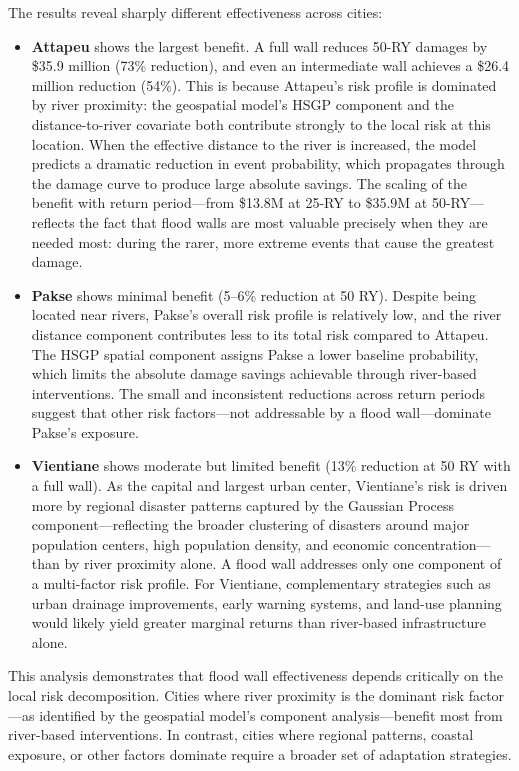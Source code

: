 \documentclass[11pt,a4paper]{article}
\begin{document}
The results reveal sharply different effectiveness across cities:

\begin{itemize}[leftmargin=2em]
  \item \textbf{Attapeu} shows the largest benefit. A full wall reduces 50-RY damages by \$35.9 million (73\% reduction), and even an intermediate wall achieves a \$26.4 million reduction (54\%). This is because Attapeu's risk profile is dominated by river proximity: the geospatial model's HSGP component and the distance-to-river covariate both contribute strongly to the local risk at this location. When the effective distance to the river is increased, the model predicts a dramatic reduction in event probability, which propagates through the damage curve to produce large absolute savings. The scaling of the benefit with return period---from \$13.8M at 25-RY to \$35.9M at 50-RY---reflects the fact that flood walls are most valuable precisely when they are needed most: during the rarer, more extreme events that cause the greatest damage.

  \item \textbf{Pakse} shows minimal benefit (5--6\% reduction at 50 RY). Despite being located near rivers, Pakse's overall risk profile is relatively low, and the river distance component contributes less to its total risk compared to Attapeu. The HSGP spatial component assigns Pakse a lower baseline probability, which limits the absolute damage savings achievable through river-based interventions. The small and inconsistent reductions across return periods suggest that other risk factors---not addressable by a flood wall---dominate Pakse's exposure.

  \item \textbf{Vientiane} shows moderate but limited benefit (13\% reduction at 50 RY with a full wall). As the capital and largest urban center, Vientiane's risk is driven more by regional disaster patterns captured by the Gaussian Process component---reflecting the broader clustering of disasters around major population centers, high population density, and economic concentration---than by river proximity alone. A flood wall addresses only one component of a multi-factor risk profile. For Vientiane, complementary strategies such as urban drainage improvements, early warning systems, and land-use planning would likely yield greater marginal returns than river-based infrastructure alone.
\end{itemize}

This analysis demonstrates that flood wall effectiveness depends critically on the local risk decomposition. Cities where river proximity is the dominant risk factor---as identified by the geospatial model's component analysis---benefit most from river-based interventions. In contrast, cities where regional patterns, coastal exposure, or other factors dominate require a broader set of adaptation strategies.
\end{document}
